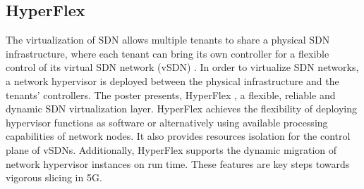 
\subsection{HyperFlex}

The virtualization of \ac{SDN} allows multiple tenants to share a physical
\ac{SDN} infrastructure, where each tenant can bring its own controller for a
flexible control of its virtual \ac{SDN} network (vSDN)
\cite{ablenk:comst:2015}. In order to virtualize \ac{SDN} networks, a network
hypervisor is deployed between the physical infrastructure and the tenants'
controllers. The poster presents, HyperFlex \cite{ablenk:im:2015}, a flexible,
reliable and dynamic SDN virtualization layer.  HyperFlex achieves the
flexibility of deploying hypervisor functions as software or alternatively
using available processing capabilities of network nodes. It also provides
resources isolation for the control plane of vSDNs.  Additionally, HyperFlex
supports the dynamic migration of network hypervisor instances on run time.
These features \cite{abasta:cnsm:2015, ablenk:tnsm:2016, abasta:im:2015} are
key steps towards vigorous slicing in 5G.





